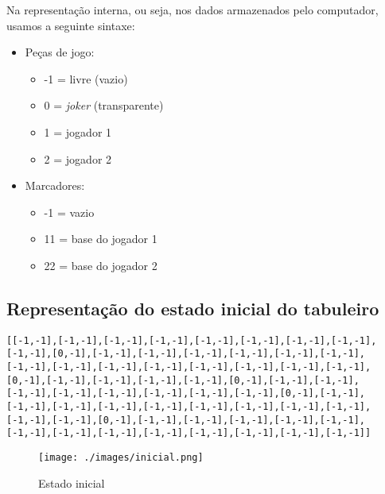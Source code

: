 \documentclass[a4paper]{article}
\begin{document}
\begin{multicols}{2}
Na representação interna, ou seja, nos dados armazenados pelo computador, usamos a seguinte sintaxe:
\begin{itemize}
	\item Peças de jogo:
	\begin{itemize}
		\item -1 = livre (vazio)
		\item 0 = \textit{joker} (transparente)
		\item 1 = jogador 1
		\item 2 = jogador 2
	\end{itemize}
	\item Marcadores:
	\begin{itemize}
		\item -1 = vazio
		\item 11 = base do jogador 1
		\item 22 = base do jogador 2
	\end{itemize}
\end{itemize}

\end{multicols}

\subsection{Representação do estado inicial do tabuleiro}

\begin{small}
\begin{lstlisting}
[[-1,-1],[-1,-1],[-1,-1],[-1,-1],[-1,-1],[-1,-1],[-1,-1],[-1,-1],
[-1,-1],[0,-1],[-1,-1],[-1,-1],[-1,-1],[-1,-1],[-1,-1],[-1,-1],
[-1,-1],[-1,-1],[-1,-1],[-1,-1],[-1,-1],[-1,-1],[-1,-1],[-1,-1],
[0,-1],[-1,-1],[-1,-1],[-1,-1],[-1,-1],[0,-1],[-1,-1],[-1,-1],
[-1,-1],[-1,-1],[-1,-1],[-1,-1],[-1,-1],[-1,-1],[0,-1],[-1,-1],
[-1,-1],[-1,-1],[-1,-1],[-1,-1],[-1,-1],[-1,-1],[-1,-1],[-1,-1],
[-1,-1],[-1,-1],[0,-1],[-1,-1],[-1,-1],[-1,-1],[-1,-1],[-1,-1],
[-1,-1],[-1,-1],[-1,-1],[-1,-1],[-1,-1],[-1,-1],[-1,-1],[-1,-1]]
\end{lstlisting}
\end{small}

\begin{figure}[h!]
	\begin{center}
		\texttt{[image: ./images/inicial.png]}
		\caption{Estado inicial}
		\label{fig:5}
	\end{center}
\end{figure}

\vspace{15 mm}
\end{document}

